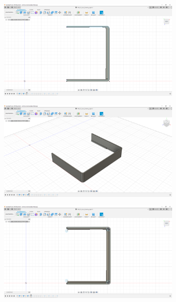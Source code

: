 \begin{figure}[h!tb]
\begin{subfigure}[t]{.3\linewidth}
		\caption[]{}
		\label{fig:design-right-03}
	\end{subfigure}
	\begin{subfigure}[t]{.3\linewidth}
		\includegraphics[width=\linewidth]{img/konstruktion_gehaeuse_rechts_004.png}
		\caption[]{}
		\label{fig:design-right-04}
	\end{subfigure}
	\begin{subfigure}[t]{.3\linewidth}
		\includegraphics[width=\linewidth]{img/konstruktion_gehaeuse_rechts_005.png}
		\caption[]{}
		\label{fig:design-right-05}
	\end{subfigure}
	\begin{subfigure}[t]{.3\linewidth}
		\includegraphics[width=\linewidth]{img/konstruktion_gehaeuse_rechts_006.png}

\end{subfigure}
\end{figure}
